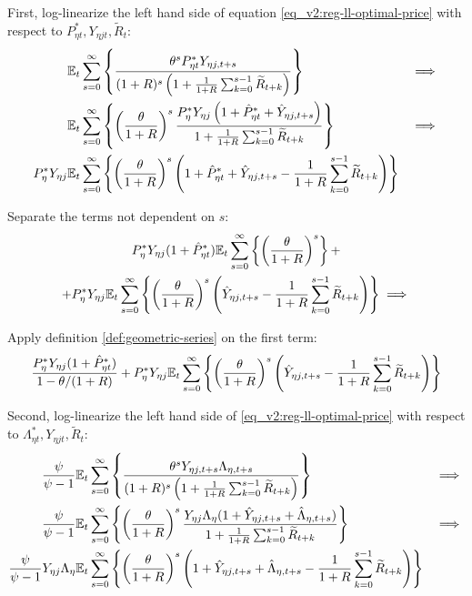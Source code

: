 \documentclass[../thesis.tex]{subfiles}
\begin{document}
First, log-linearize the left hand side of equation \ref{eq_v2:reg-ll-optimal-price} with respect to \( P_{\eta t}^{\ast}, Y_{\eta j t}, \widetilde{R}_t \):
\begin{alignat}{2}
	& {\mathbb{E}_{t}} \sum_{s=0}^{\infty} \left\{ \frac{\theta^s P_{\eta t}^{\ast} Y_{\eta j,t+s}}{ (1 + R)^s \left( 1 + \frac{1}{1 + R} \sum_{k=0}^{s-1} \widetilde{R}_{t+k} \right)} \right\} &\implies \nonumber \\
	& {\mathbb{E}_{t}} \sum_{s=0}^{\infty} \left\{ \left( \frac{\theta}{1 + R} \right)^s  \frac{ P_{\eta}^{\ast} Y_{\eta j} \left( 1 + \hat{P}_{\eta t}^{\ast} + \hat{Y}_{\eta j, t+s} \right)}{ 1 + \frac{1}{1 + R} \sum_{k=0}^{s-1} \widetilde{R}_{t+k}} \right\} &\implies \nonumber \\
	P_{\eta}^{\ast} Y_{\eta j} &{\mathbb{E}_{t}} \sum_{s=0}^{\infty} \left\{ \left( \frac{\theta}{1 + R} \right)^s \left( 1 + \hat{P}_{\eta t}^{\ast} + \hat{Y}_{\eta j, t+s} - \frac{1}{1 + R} \sum_{k=0}^{s-1} \widetilde{R}_{t+k} \right) \right\} & \nonumber
\end{alignat}

Separate the terms not dependent on $s$:
\begin{multline}
	P_{\eta}^{\ast} Y_{\eta j} ( 1 + \hat{P}_{\eta t}^{\ast} ) {\mathbb{E}_{t}} \sum_{s=0}^{\infty} \left\{ \left( \frac{\theta}{1 + R} \right)^s \right\} + \\
	+ P_{\eta}^{\ast} Y_{\eta j} {\mathbb{E}_{t}} \sum_{s=0}^{\infty} \left\{ \left( \frac{\theta}{1 + R} \right)^s \left( \hat{Y}_{\eta j, t+s} - \frac{1}{1 + R} \sum_{k=0}^{s-1} \widetilde{R}_{t+k} \right) \right\} \implies \nonumber
\end{multline}

Apply definition \ref{def:geometric-series} on the first term:
\begin{align}
	\frac{ P_{\eta}^{\ast} Y_{\eta j} ( 1 + \hat{P}_{\eta t}^{\ast} )}{1-\theta /(1+R)} + P_{\eta}^{\ast} Y_{\eta j} {\mathbb{E}_{t}} \sum_{s=0}^{\infty} \left\{ \left( \frac{\theta}{1 + R} \right)^s \left( \hat{Y}_{\eta j, t+s} - \frac{1}{1 + R} \sum_{k=0}^{s-1} \widetilde{R}_{t+k} \right) \right\} \nonumber
\end{align}

Second, log-linearize the left hand side of \ref{eq_v2:reg-ll-optimal-price} with respect to \( \Lambda_{\eta t}^{\ast}, Y_{\eta j t}, \widetilde{R}_t \):
\begin{alignat}{2}
	\frac{\psi}{\psi-1} &{\mathbb{E}_{t}} \sum_{s=0}^{\infty} \left\{ \frac{\theta^s Y_{\eta j,t+s} \Lambda_{\eta, t+s}}{ (1 + R)^s \left( 1 + \frac{1}{1 + R} \sum_{k=0}^{s-1} \widetilde{R}_{t+k} \right)} \right\} & \implies \nonumber \\
	\frac{\psi}{\psi-1} &{\mathbb{E}_{t}} \sum_{s=0}^{\infty} \left\{ \left( \frac{\theta}{1 + R} \right)^s \frac{ Y_{\eta j} \Lambda_{\eta} (1+ \hat{Y}_{\eta j, t+s} + \hat{\Lambda}_{\eta, t+s})}{ 1 + \frac{1}{1 + R} \sum_{k=0}^{s-1} \widetilde{R}_{t+k}} \right\} & \implies \nonumber \\
	\frac{\psi}{\psi-1} Y_{\eta j} \Lambda_{\eta} &{\mathbb{E}_{t}} \sum_{s=0}^{\infty} \left\{ \left( \frac{\theta}{1 + R} \right)^s \left( 1+ \hat{Y}_{\eta j, t+s} + \hat{\Lambda}_{\eta, t+s} - \frac{1}{1 + R} \sum_{k=0}^{s-1} \widetilde{R}_{t+k} \right) \right\} & \nonumber
\end{alignat}
\end{document}
